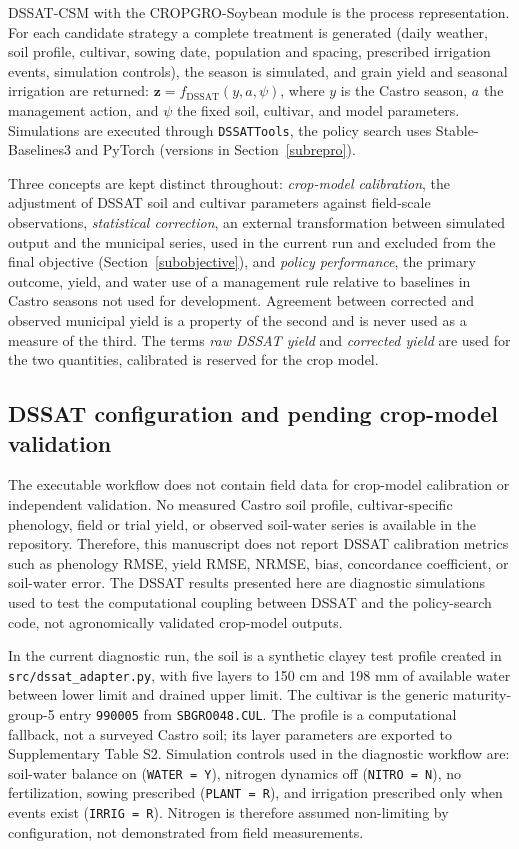 \documentclass[times,final,authoryear]{elsarticle}
\begin{document}
DSSAT-CSM with the CROPGRO-Soybean module is the process representation. For each candidate strategy a complete treatment is generated (daily weather, soil profile, cultivar, sowing date, population and spacing, prescribed irrigation events, simulation controls), the season is simulated, and grain yield and seasonal irrigation are returned: $\mathbf{z} = f_{\text{DSSAT}}(y,a,\psi)$, where $y$ is the Castro season, $a$ the management action, and $\psi$ the fixed soil, cultivar, and model parameters. Simulations are executed through \texttt{DSSATTools}, the policy search uses Stable-Baselines3 and PyTorch (versions in Section~\ref{subrepro}).

Three concepts are kept distinct throughout: \emph{crop-model calibration}, the adjustment of DSSAT soil and cultivar parameters against field-scale observations, \emph{statistical correction}, an external transformation between simulated output and the municipal series, used in the current run and excluded from the final objective (Section~\ref{subobjective}), and \emph{policy performance}, the primary outcome, yield, and water use of a management rule relative to baselines in Castro seasons not used for development. Agreement between corrected and observed municipal yield is a property of the second and is never used as a measure of the third. The terms \emph{raw DSSAT yield} and \emph{corrected yield} are used for the two quantities, calibrated is reserved for the crop model.


\subsection{DSSAT configuration and pending crop-model validation}
\label{subcropmodel}

The executable workflow does not contain field data for crop-model calibration or independent validation. No measured Castro soil profile, cultivar-specific phenology, field or trial yield, or observed soil-water series is available in the repository. Therefore, this manuscript does not report DSSAT calibration metrics such as phenology RMSE, yield RMSE, NRMSE, bias, concordance coefficient, or soil-water error. The DSSAT results presented here are diagnostic simulations used to test the computational coupling between DSSAT and the policy-search code, not agronomically validated crop-model outputs.

In the current diagnostic run, the soil is a synthetic clayey test profile created in \texttt{src/dssat\_adapter.py}, with five layers to 150 cm and 198 mm of available water between lower limit and drained upper limit. The cultivar is the generic maturity-group-5 entry \texttt{990005} from \texttt{SBGRO048.CUL}. The profile is a computational fallback, not a surveyed Castro soil; its layer parameters are exported to Supplementary Table S2. Simulation controls used in the diagnostic workflow are: soil-water balance on (\texttt{WATER = Y}), nitrogen dynamics off (\texttt{NITRO = N}), no fertilization, sowing prescribed (\texttt{PLANT = R}), and irrigation prescribed only when events exist (\texttt{IRRIG = R}). Nitrogen is therefore assumed non-limiting by configuration, not demonstrated from field measurements.
\end{document}
